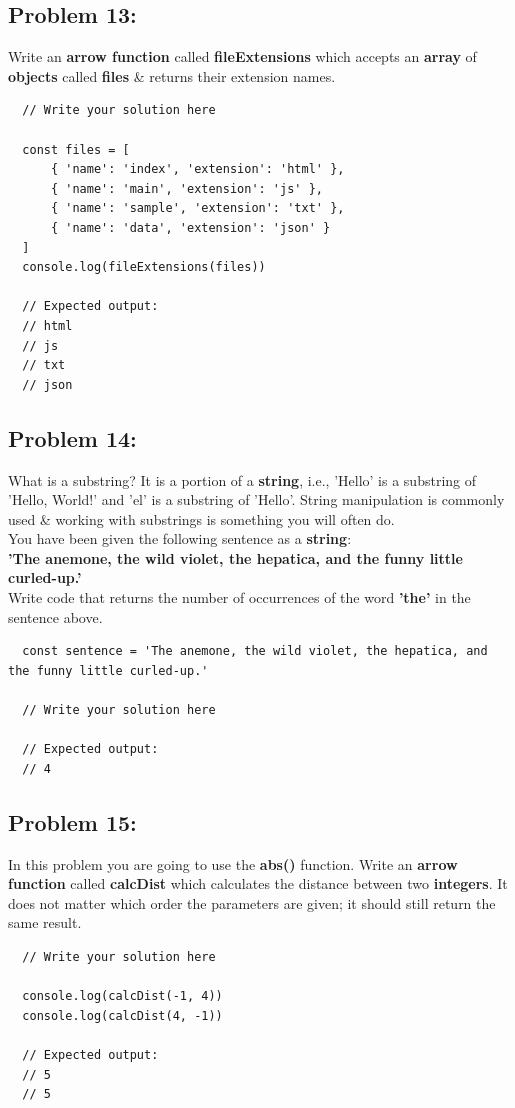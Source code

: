 \documentclass{article}
\begin{document}
\subsection*{Problem 13:}
Write an \textbf{arrow function} called \textbf{fileExtensions} which accepts an \textbf{array} of \textbf{objects} called \textbf{files} \& returns their extension names.

\begin{verbatim}
  // Write your solution here

  const files = [
      { 'name': 'index', 'extension': 'html' },
      { 'name': 'main', 'extension': 'js' },
      { 'name': 'sample', 'extension': 'txt' },
      { 'name': 'data', 'extension': 'json' }
  ]
  console.log(fileExtensions(files))

  // Expected output:
  // html
  // js
  // txt
  // json
\end{verbatim}

\subsection*{Problem 14:}
What is a substring? It is a portion of a \textbf{string}, i.e., 'Hello' is a substring of 'Hello, World!' and 'el' is a substring of 'Hello'. String manipulation is commonly used \& working with substrings is something you will often do. \\

You have been given the following sentence as a \textbf{string}: \\

\textbf{'The anemone, the wild violet, the hepatica, and the funny little curled-up.'} \\

Write code that returns the number of occurrences of the word \textbf{'the'} in the sentence above.

\begin{verbatim}
  const sentence = 'The anemone, the wild violet, the hepatica, and the funny little curled-up.'

  // Write your solution here

  // Expected output:
  // 4
\end{verbatim}

\subsection*{Problem 15:}
In this problem you are going to use the \textbf{abs()} function. Write an \textbf{arrow function} called \textbf{calcDist} which calculates the distance between two \textbf{integers}. It does not matter which order the parameters are given; it should still return the same result. 

\begin{verbatim}
  // Write your solution here

  console.log(calcDist(-1, 4))
  console.log(calcDist(4, -1))

  // Expected output:
  // 5
  // 5
\end{verbatim}
\end{document}
